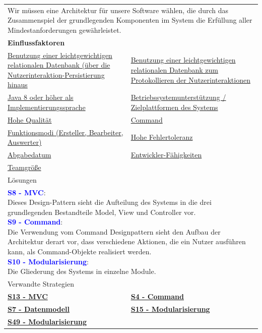 \documentclass[enabledeprecatedfontcommands,fontsize=11pt,paper=a4,twoside]{scrartcl}
\newcounter{one}
\newcommand{\cb}[1]{{\textcolor{blue}{#1}}}
\begin{document}
	\begin{tabular} {|p{8cm} p{8cm}|}
		\hline
		\rowcolor{prob}\multicolumn{2}{|l|}{\parbox{16cm}{\textbf{04: Auswahl der grundlegenden Softwarearchitektur}}} \\  \hline\hline 
		\multicolumn{2}{|l|}{\parbox{16cm}{Wir müssen eine Architektur für unsere Software wählen, die durch das Zusammenspiel der grundlegenden Komponenten im System die Erfüllung aller Mindestanforderungen gewährleistet.}}\rule{0pt}{4ex}\\ [1ex] \hline
		\multicolumn{2}{|l|}{\textbf{Einflussfaktoren}}\\
		\hyperlink {e}{Benutzung einer leichtgewichtigen relationalen Datenbank (über die Nutzerinteraktion-Persistierung hinaus} &
		\hyperlink {d}{Benutzung einer leichtgewichtigen relationalen Datenbank zum Protokollieren der Nutzerinteraktionen}\\ 
		\hyperlink{b}{Java 8 oder höher als Implementierungssprache} &
		\hyperlink {f}{Betriebssystemunterstützung / Zielplattformen des Systems}\\
		\hyperlink {h}{Hohe Qualität}&
		\hyperlink {i}{Command} \\
		\hyperlink {z}{Funktionsmodi (Ersteller, Bearbeiter, Auswerter)}  &
		\hyperlink {tt}{Hohe Fehlertoleranz} \\
		\hyperlink {uu}{Abgabedatum} &
		\hyperlink {vv}{Entwickler-Fähigkeiten} \\
		\hyperlink {xx}{Teamgröße} &
		\\ \hline
		\multicolumn{2}{|l|}{Lösungen} \\
		\multicolumn{2}{|l|}{\parbox{16cm}{
				\textbf{\cb{\hypertarget{bbb}{S8 - MVC}}}: \\
				Dieses Design-Pattern sieht die Aufteilung des Systems in die drei grundlegenden Bestandteile Model, View und Controller vor. \\
				\textbf{\cb{\hypertarget{command}{S9 - Command}}}: \\
				Die Verwendung vom Command Designpattern sieht den Aufbau der Architektur derart vor, dass verschiedene Aktionen, die ein Nutzer ausführen kann, als Command-Objekte realisiert werden.\\
				\textbf{\cb{\hypertarget{aadd}{S10 - Modularisierung}}}: \\
				Die Gliederung des Systems in einzelne Module.
		} }\\ [8ex] \hline
		\multicolumn{2}{|l|}{Verwandte Strategien} \\
		\textbf{\hyperlink {modelviewcontroller}{S13 - MVC}} &
		\textbf{\hyperlink {zz}{S4 - Command}} \\
		\textbf{\hyperlink {aaa}{S7 - Datenmodell}} &
		\textbf{\hyperlink {aabb}{S15 - Modularisierung}} \\
		\textbf{\hyperlink {aaaa}{S49 - Modularisierung}}&
		\\\hline
	\end{tabular}\\ \\ \\
\end{document}
